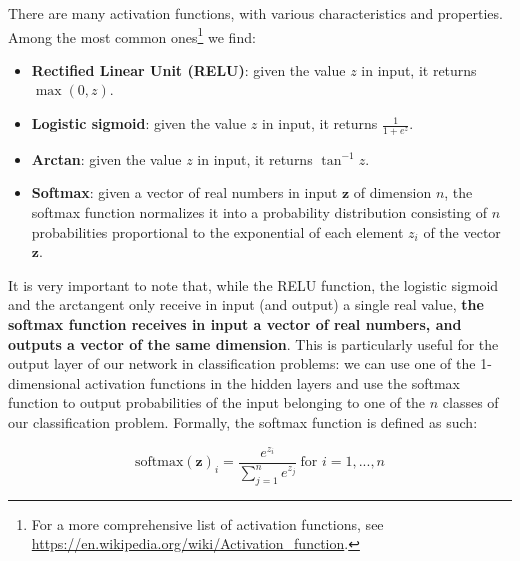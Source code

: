 There are many activation functions, with various characteristics and properties. Among the most common ones\footnote{For a more comprehensive list of activation functions, see \url{https://en.wikipedia.org/wiki/Activation_function}.} we find:

\begin{itemize}
    \item \textbf{Rectified Linear Unit (RELU)}: given the value $z$ in input, it returns $\max(0,z)$.
    \item \textbf{Logistic sigmoid}: given the value $z$ in input, it returns $\frac{1}{1+e^z}$.
    \item \textbf{Arctan}: given the value $z$ in input, it returns $\tan^{-1}z$.
    \item \textbf{Softmax}: given a vector of real numbers in input $\boldsymbol{z}$ of dimension $n$, the softmax function normalizes it into a probability distribution consisting of $n$ probabilities proportional to the exponential of each element $z_i$ of the vector $\boldsymbol{z}$.
\end{itemize}

It is very important to note that, while the RELU function, the logistic sigmoid and the arctangent only receive in input (and output) a single real value, \textbf{the softmax function receives in input a vector of real numbers, and outputs a vector of the same dimension}. This is particularly useful for the output layer of our network in classification problems: we can use one of the 1-dimensional activation functions in the hidden layers and use the softmax function to output probabilities of the input belonging to one of the $n$ classes of our classification problem. Formally, the softmax function is defined as such:

\begin{equation}
    \text{softmax}(\boldsymbol{z})_i= \frac{e^{z_i}}{\sum_{j=1}^{n} e^{z_j}} \  \text{for } i = 1, ..., n
\end{equation}